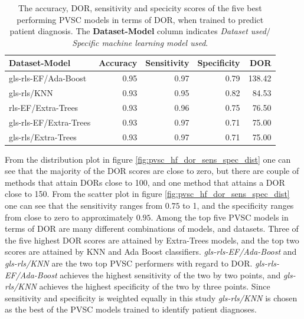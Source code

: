 \begin{table}
    \centering
    \begin{tabular}{lrrrr}
        \toprule
        Dataset-Model          &  Accuracy &  Sensitivity &  Specificity &  DOR \\
        \midrule
        gls-rls-EF/Ada-Boost   &      0.95 &         0.97 &         0.79 & 138.42 \\
        gls-rls/KNN            &      0.93 &         0.95 &         0.82 &  84.53 \\
        rls-EF/Extra-Trees     &      0.93 &         0.96 &         0.75 &  76.50 \\
        gls-rls-EF/Extra-Trees &      0.93 &         0.97 &         0.71 &  75.00 \\
        gls-rls/Extra-Trees    &      0.93 &         0.97 &         0.71 &  75.00 \\
        \bottomrule
    \end{tabular}
    \caption{The accuracy, DOR, sensitivity and specicity scores of the five best performing PVSC models in terms of DOR, when trained to predict patient diagnosis.
             The \textbf{Dataset-Model} column indicates \textit{Dataset used}$/$\textit{Specific machine learning model used}.}
    \label{tab:pvsc_hf_dor_sens_spec_dist}
\end{table}

From the distribution plot in figure \ref{fig:pvsc_hf_dor_sens_spec_dist} one can see that the majority of the DOR scores are close to zero, but there are couple of methods that attain DORs 
close to 100, and one method that attains a DOR close to 150.
From the scatter plot in figure \ref{fig:pvsc_hf_dor_sens_spec_dist} one can see that the sensitivity ranges from $0.75$ to 1, and the specificity ranges from 
close to zero to approximately $0.95$. 
Among the top five PVSC models in terms of DOR are many different combinations of models, and datasets. 
Three of the five highest DOR scores are attained by Extra-Trees models, and the top two scores are attained by KNN and Ada Boost classifiers. 
\textit{gls-rls-EF/Ada-Boost} and \textit{gls-rls/KNN} are the two top PVSC performers with regard to DOR.
\textit{gls-rls-EF/Ada-Boost} achieves the highest sensitivity of the two by two points, and \textit{gls-rls/KNN} achieves the highest specificity of the two by three points.
Since sensitivity and specificity is weighted equally in this study \textit{gls-rls/KNN} is chosen as the best of the PVSC models trained to identify patient diagnoses.

